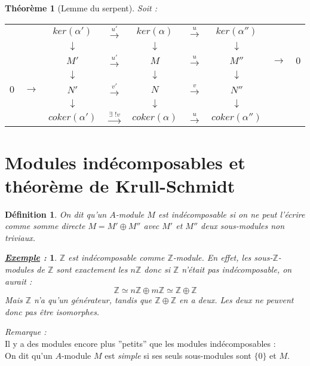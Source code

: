 \documentclass{article}           %
\newcommand\Z{\mathbb{Z}}
\let\dummy\exists						%
\renewcommand*{\exists}{\dummy \,}
\theoremstyle{break}
\theoremstyle{add}
\theoremstyle{break} %
\newtheorem{theoreme}{Théorème}[section]
\newtheorem{definition}{Définition}[section]
\theoremstyle{add}
\newtheorem*{exemple}{\textit{\underline{Exemple} :}}
\begin{document}
\begin{theoreme}[Lemme du serpent]
Soit : \\

\begin{tabular}{ccccccccc}
&& $ker(\alpha')$ & $\overset{u'}{\longrightarrow}$ & $ker(\alpha)$ & $\overset{u}{\longrightarrow}$ & $ker(\alpha'')$ && \\
&& $\downarrow$ && $\downarrow$ && $\downarrow$ &&\\
&& $M'$ & $\overset{u'}{\longrightarrow}$ & $M$ & $\overset{u}{\longrightarrow}$ & $M''$ & $\longrightarrow$ & $0$ \\
&& $\downarrow$ && $\downarrow$ && $\downarrow$ && \\
$0$ & $\longrightarrow$ & $N'$ & $\overset{v'}{\longrightarrow}$ & $N$ & $\overset{v}{\longrightarrow}$ & $N''$ && \\
&& $\downarrow$ && $\downarrow$ && $\downarrow$ && \\
&& $coker(\alpha')$ & $\overset{\exists ! v}{\longrightarrow}$ & $coker(\alpha)$ & $\overset{u}{\longrightarrow}$ & $coker(\alpha'')$ && \\
\end{tabular}

\end{theoreme}



\section{Modules indécomposables et théorème de Krull-Schmidt}

\begin{definition}
On dit qu'un $A$-module $M$ est \textit{indécomposable} si on ne peut l'écrire comme somme directe $M = M' \oplus M''$ avec $M'$ et $M''$ deux sous-modules non triviaux. 
\end{definition}

\begin{exemple}
$\Z$ est indécomposable comme $\Z$-module. En effet, les sous-$\Z$-modules de $\Z$ sont exactement les $n\Z$ donc si $\Z$ n'était pas indécomposable, on aurait :
$$ \Z \simeq n\Z \oplus m\Z \simeq \Z \oplus \Z$$
Mais $\Z$ n'a qu'un générateur, tandis que $\Z \oplus \Z$ en a deux. Les deux ne peuvent donc pas être isomorphes.
\end{exemple}

\textit{Remarque :} \\
Il y a des modules encore plus ''petits'' que les modules indécomposables : \\
On dit qu'un $A$-module $M$ est \textit{simple} si ses seuls sous-modules sont $\{0\}$ et $M$. \\
\end{document}
